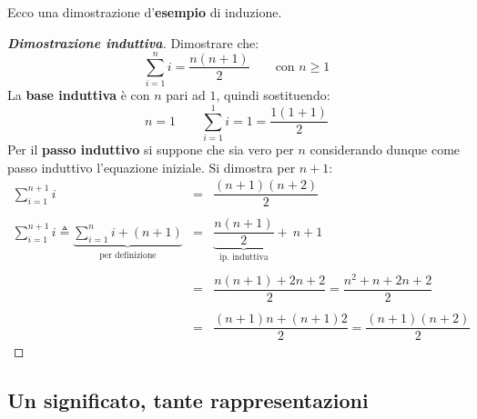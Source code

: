 \documentclass[a4paper]{article}
\begin{document}
	\noindent
	Ecco una dimostrazione d'\textcolor{Green4}{\textbf{esempio}} di induzione.
	\begin{proof}[\textbf{Dimostrazione induttiva}]
		Dimostrare che:
		\begin{equation*}
			\sum_{i = 1}^{n} i = \dfrac{n \left( n + 1 \right)}{2} \hspace{2em} \text{con } n \ge 1
		\end{equation*}
		La \textbf{base induttiva} è con $n$ pari ad $1$, quindi sostituendo:
		\begin{equation*}
			n = 1 \hspace{2em} \sum_{i = 1}^{1} i = 1 = \dfrac{1 \left( 1 + 1 \right)}{2}
		\end{equation*}
		Per il \textbf{passo induttivo} si suppone che sia vero per $n$ considerando dunque come passo induttivo l'equazione iniziale. Si dimostra per $n + 1$:
		\begin{equation*}
			\begin{array}{rll}
				\displaystyle\sum_{i=1}^{n+1} i & = & \dfrac{ \left(n+1\right) \left(n+2\right) }{2} \\
				\\
				\displaystyle\sum_{i=1}^{n+1} i \triangleq \underbrace{\sum_{i=1}^{n} i + \left(n+1\right)}_{\text{per definizione}} & = & \underbrace{\dfrac{n \left(n+1\right)}{2}}_{\text{ip. induttiva}} + \: n + 1 \\
				\\
				& = & \dfrac{n \left(n+1\right) + 2n + 2}{2} = \dfrac{n^{2} + n + 2n + 2}{2} \\
				\\
				& = & \dfrac{\left(n+1\right) n + \left(n+1\right) 2}{2} = \dfrac{\left(n+1\right) \left(n+2\right)}{2}
			\end{array}
		\end{equation*}
	\end{proof}\newpage

	\subsection{Un significato, tante rappresentazioni}
	
\end{document}
